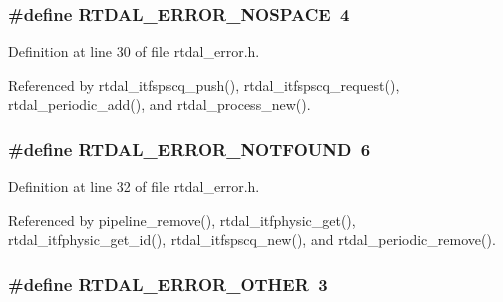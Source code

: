 \subsubsection[{R\-T\-D\-A\-L\-\_\-\-E\-R\-R\-O\-R\-\_\-\-N\-O\-S\-P\-A\-C\-E}]{\setlength{\rightskip}{0pt plus 5cm}\#define R\-T\-D\-A\-L\-\_\-\-E\-R\-R\-O\-R\-\_\-\-N\-O\-S\-P\-A\-C\-E~4}\label{rtdal__error_8h_a644929c31c5df9e81151bb9e2b36d831}


Definition at line 30 of file rtdal\-\_\-error.\-h.



Referenced by rtdal\-\_\-itfspscq\-\_\-push(), rtdal\-\_\-itfspscq\-\_\-request(), rtdal\-\_\-periodic\-\_\-add(), and rtdal\-\_\-process\-\_\-new().

\subsubsection[{R\-T\-D\-A\-L\-\_\-\-E\-R\-R\-O\-R\-\_\-\-N\-O\-T\-F\-O\-U\-N\-D}]{\setlength{\rightskip}{0pt plus 5cm}\#define R\-T\-D\-A\-L\-\_\-\-E\-R\-R\-O\-R\-\_\-\-N\-O\-T\-F\-O\-U\-N\-D~6}\label{rtdal__error_8h_ab6ec7eb3444e8c5d495f000fc88a9f96}


Definition at line 32 of file rtdal\-\_\-error.\-h.



Referenced by pipeline\-\_\-remove(), rtdal\-\_\-itfphysic\-\_\-get(), rtdal\-\_\-itfphysic\-\_\-get\-\_\-id(), rtdal\-\_\-itfspscq\-\_\-new(), and rtdal\-\_\-periodic\-\_\-remove().

\subsubsection[{R\-T\-D\-A\-L\-\_\-\-E\-R\-R\-O\-R\-\_\-\-O\-T\-H\-E\-R}]{\setlength{\rightskip}{0pt plus 5cm}\#define R\-T\-D\-A\-L\-\_\-\-E\-R\-R\-O\-R\-\_\-\-O\-T\-H\-E\-R~3}\label{rtdal__error_8h_a1fe951f1bafef5d2f48d5e477c54bfe9}



